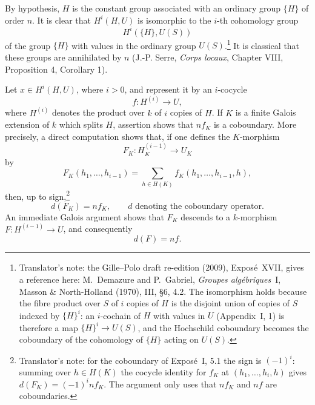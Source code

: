 By hypothesis, \(H\) is the constant group associated with an
ordinary group \(\{H\}\) of order \(n\).  It is
clear that \(H^i(H,U)\) is isomorphic
to the \(i\)-th cohomology group
\[
  H^i(\{H\},U(S))
\]
of the group \(\{H\}\) with values in the ordinary group \(U(S)\).\footnote{Translator's
note: the Gille--Polo draft re-edition (2009), Exposé~XVII, gives a
reference here: M.~Demazure and P.~Gabriel, \emph{Groupes
algébriques}~I, Masson \& North-Holland (1970), III, \S6, 4.2. The
isomorphism holds because the fibre product over \(S\) of \(i\)
copies of \(H\) is the disjoint union of copies of \(S\) indexed by
\(\{H\}^i\): an \(i\)-cochain of \(H\) with values in \(U\)
(Appendix~I, 1) is therefore a map \(\{H\}^i\to U(S)\), and the
Hochschild coboundary becomes the coboundary of the cohomology of
\(\{H\}\) acting on \(U(S)\).}
It is classical that these groups are annihilated by \(n\)
(J.-P. Serre, \emph{Corps locaux}, Chapter VIII, Proposition 4,
Corollary 1).

Let \(x\in H^i(H,U)\), where \(i>0\), and represent it by an
\(i\)-cocycle
\[
  f:H^{(i)}\longrightarrow U,
\]
where \(H^{(i)}\) denotes the product over \(k\) of \(i\) copies
of \(H\).  If \(K\) is a finite Galois extension of \(k\) which
splits \(H\), assertion  shows that \(nf_K\) is a coboundary.
More precisely, a direct computation shows that, if one defines
the \(K\)-morphism
\[
  F_K:H_K^{(i-1)}\longrightarrow U_K
\]
by
\[
  F_K(h_1,\ldots,h_{i-1})
    =\sum_{h\in H(K)}
      f_K(h_1,\ldots,h_{i-1},h),
\]
then, up to sign,\footnote{Translator's note: for the coboundary of
Exposé~I, 5.1 the sign is \((-1)^i\): summing over \(h\in H(K)\) the
cocycle identity for \(f_K\) at \((h_1,\ldots,h_i,h)\) gives
\(d(F_K)=(-1)^i nf_K\). The argument only uses that \(nf_K\) and
\(nf\) are coboundaries.}
\[
  d(F_K)=nf_K,
  \qquad d\text{ denoting the coboundary operator}.
\]
An immediate Galois argument shows that \(F_K\) descends to a
\(k\)-morphism \(F:H^{(i-1)}\to U\), and consequently
\[
  d(F)=nf.
\]
